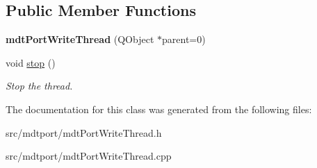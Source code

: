 \subsection*{Public Member Functions}
\begin{DoxyCompactItemize}
\item 
\hypertarget{classmdt_port_write_thread_a994b96eafdd721ccff2f2410a5abd5e3}{
{\bfseries mdtPortWriteThread} (QObject $\ast$parent=0)}
\label{classmdt_port_write_thread_a994b96eafdd721ccff2f2410a5abd5e3}

\item 
\hypertarget{classmdt_port_write_thread_a69702ab3a95c238fb451f866efc7cb34}{
void \hyperlink{classmdt_port_write_thread_a69702ab3a95c238fb451f866efc7cb34}{stop} ()}
\label{classmdt_port_write_thread_a69702ab3a95c238fb451f866efc7cb34}

\begin{DoxyCompactList}\small\item\em Stop the thread. \end{DoxyCompactList}\end{DoxyCompactItemize}


The documentation for this class was generated from the following files:\begin{DoxyCompactItemize}
\item 
src/mdtport/mdtPortWriteThread.h\item 
src/mdtport/mdtPortWriteThread.cpp\end{DoxyCompactItemize}
